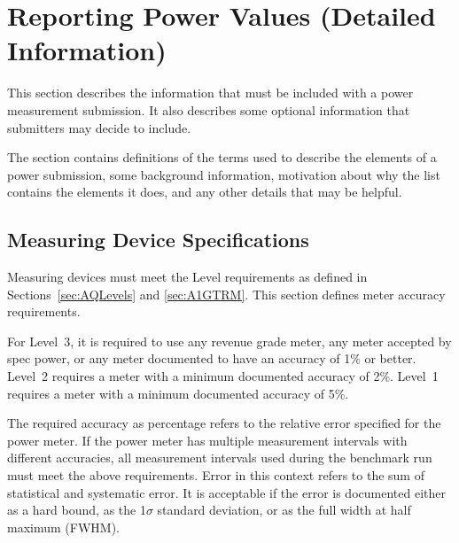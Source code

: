 \chapter{Reporting Power Values \normalsize{(Detailed Information)}}
\label{sec:reporting}

\noindent
This section describes the information that must be included with a power measurement submission.
It also describes some optional information that submitters may decide to include.
\wl

\noindent
The section contains definitions of the terms used to describe the elements of a power submission, some background information, motivation about why the list contains the elements it does, and any other details that may be helpful.
\noindent


\section{Measuring Device Specifications}
\label{sec:MDSpecs}
\noindent
Measuring devices must meet the Level requirements as defined in 
Sections~\ref{sec:AQLevels} and \ref{sec:A1GTRM}.
This section defines meter accuracy requirements.
\wl

\noindent
For Level~3, it is required to use any revenue grade meter, any meter accepted by spec power, or any meter documented to have an accuracy of 1\% or better.
Level~2 requires a meter with a minimum documented accuracy of 2\%.
Level~1 requires a meter with a minimum documented accuracy of 5\%.
\wl

\noindent
The required accuracy as percentage refers to the relative error specified for the power meter.
If the power meter has multiple measurement intervals with different accuracies, all measurement intervals used during the benchmark run must meet the above requirements.
Error in this context refers to the sum of statistical and systematic error.
It is acceptable if the error is documented either as a hard bound, as the 1$\sigma$ standard deviation, or as the full width at half maximum (FWHM).
\wl

